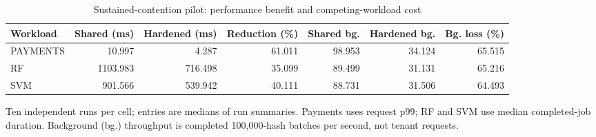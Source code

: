 \begin{table}[t]
\caption{Sustained-contention pilot: performance benefit and competing-workload cost}
\label{tab:pilotcontrols}
\centering\small
\begin{tabular}{lrrrrrr}
\toprule
Workload & Shared (ms) & Hardened (ms) & Reduction (\%) & Shared bg. & Hardened bg. & Bg. loss (\%) \\
\midrule
PAYMENTS & 10.997 & 4.287 & 61.011 & 98.953 & 34.124 & 65.515 \\
RF & 1103.983 & 716.498 & 35.099 & 89.499 & 31.131 & 65.216 \\
SVM & 901.566 & 539.942 & 40.111 & 88.731 & 31.506 & 64.493 \\
\bottomrule
\end{tabular}
\smallskip
\parbox{.95\textwidth}{\footnotesize Ten independent runs per cell; entries are medians of run summaries. Payments uses request p99; RF and SVM use median completed-job duration. Background (bg.) throughput is completed 100,000-hash batches per second, not tenant requests.}
\end{table}
